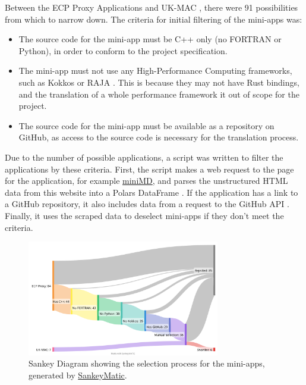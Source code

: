 Between the ECP Proxy Applications \cite{ECPProxyApplications} and UK-MAC \cite{UKMiniAppConsortium}, there were 91 possibilities from which to narrow down. The criteria for initial filtering of the mini-apps was:
\begin{itemize}
    \item The source code for the mini-app must be C++ only (no FORTRAN or Python), in order to conform to the project specification.
    \item The mini-app must not use any High-Performance Computing frameworks, such as Kokkos \cite{KokkosEcosystem} or RAJA \cite{RAJAPortabilitySuite}. This is because they may not have Rust bindings, and the translation of a whole performance framework it out of scope for the project.
    \item The source code for the mini-app must be available as a repository on GitHub, as access to the source code is necessary for the translation process.
\end{itemize}

Due to the number of possible applications, a script was written to filter the applications by these criteria. First, the script makes a web request to the page for the application, for example \href{https://proxyapps.exascaleproject.org/app/minimd/}{miniMD}, and parses the unstructured HTML data from this website into a Polars DataFrame \cite{PolarsPolars2023}. If the application has a link to a GitHub repository, it also includes data from a request to the GitHub API \cite{GitHubRESTAPI}. Finally, it uses the scraped data to deselect mini-apps if they don't meet the criteria.

\begin{figure}[h]
    \centering
    \includegraphics[width=0.75\textwidth]{images/8_appendix/miniapp_sankey.png}
    \caption{Sankey Diagram showing the selection process for the mini-apps, generated by \href{https://sankeymatic.com/build/}{SankeyMatic}.}
    \label{fig:miniapp_sankey}
\end{figure}

